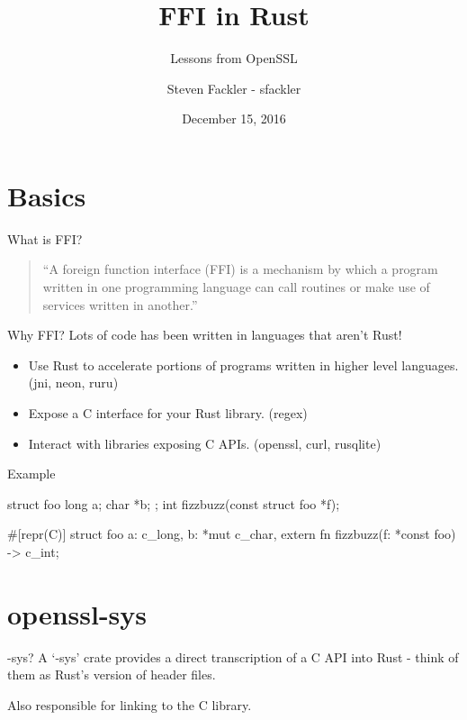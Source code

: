 \documentclass{beamer}
\title{FFI in Rust}
\subtitle{Lessons from OpenSSL}
\author[sfackler]{Steven Fackler - sfackler}
\date{December 15, 2016}
\begin{document}

\frame{\titlepage}

\frame{\tableofcontents}

\section{Basics}

\begin{frame}{What is FFI?}
    \begin{quote}
        ``A foreign function interface (FFI) is a mechanism by which a program
        written in one programming language can call routines or make use of
        services written in another.''
    \end{quote}
\end{frame}

\begin{frame}{Why FFI?}
    Lots of code has been written in languages that aren't Rust!

    \begin{itemize}
        \item Use Rust to accelerate portions of programs written in higher
            level languages. (jni, neon, ruru)
        \item Expose a C interface for your Rust library. (regex)
        \item Interact with libraries exposing C APIs. (openssl, curl,
            rusqlite)
    \end{itemize}
\end{frame}

\begin{frame}[fragile]{Example}
    \begin{ccode}
struct foo {
    long a;
    char *b;
};
int fizzbuzz(const struct foo *f);
    \end{ccode}
    \vspace{10pt}
    \begin{rustcode}
#[repr(C)]
struct foo {
    a: c_long,
    b: *mut c_char,
}
extern {
    fn fizzbuzz(f: *const foo) -> c_int;
}
    \end{rustcode}
\end{frame}

\section{openssl-sys}

\begin{frame}{-sys?}
    A `-sys' crate provides a direct transcription of a C API into Rust - think
    of them as Rust's version of header files.

    Also responsible for linking to the C library.
\end{frame}
\end{document}
